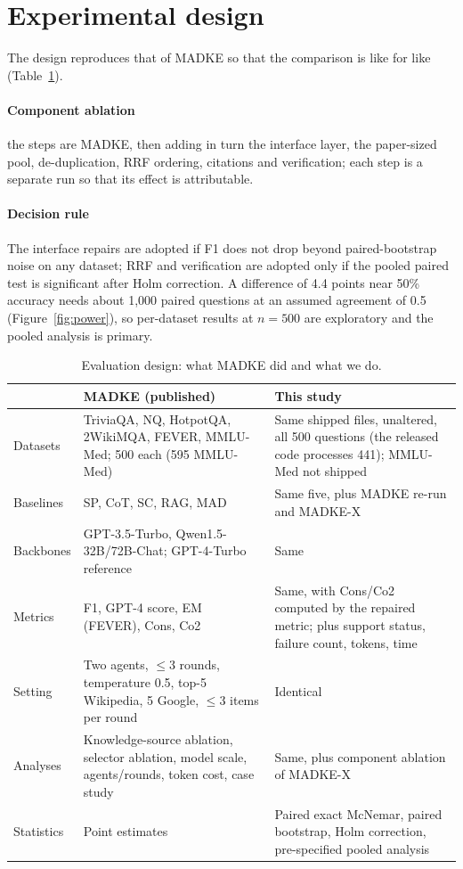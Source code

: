 \section{Experimental design}
\label{sec:design}

The design reproduces that of MADKE so that the comparison is like for like (Table~\ref{tab:design}).

\paragraph{Component ablation} the steps are MADKE, then adding in turn the interface layer, the paper-sized pool, de-duplication, RRF ordering, citations and verification; each step is a separate run so that its effect is attributable.

\paragraph{Decision rule} The interface repairs are adopted if F1 does not drop beyond paired-bootstrap noise on any dataset; RRF and verification are adopted only if the pooled paired test is significant after Holm correction. A difference of 4.4 points near 50\% accuracy needs about 1,000 paired questions at an assumed agreement of 0.5 (Figure~\ref{fig:power}), so per-dataset results at $n{=}500$ are exploratory and the pooled analysis is primary.

\begin{table}[!htbp]
\centering
\small
\caption{Evaluation design: what MADKE did and what we do.}
\label{tab:design}
\begin{tabular}{p{}p{}p{}}
\toprule
 & MADKE (published) & This study \\
\midrule
Datasets & TriviaQA, NQ, HotpotQA, 2WikiMQA, FEVER, MMLU-Med; 500 each (595 MMLU-Med) & Same shipped files, unaltered, all 500 questions (the released code processes 441); MMLU-Med not shipped \\
Baselines & SP, CoT, SC, RAG, MAD & Same five, plus MADKE re-run and MADKE-X \\
Backbones & GPT-3.5-Turbo, Qwen1.5-32B/72B-Chat; GPT-4-Turbo reference & Same \\
Metrics & F1, GPT-4 score, EM (FEVER), Cons, Co2 & Same, with Cons/Co2 computed by the repaired metric; plus support status, failure count, tokens, time \\
Setting & Two agents, $\le$3 rounds, temperature 0.5, top-5 Wikipedia, 5 Google, $\le$3 items per round & Identical \\
Analyses & Knowledge-source ablation, selector ablation, model scale, agents/rounds, token cost, case study & Same, plus component ablation of MADKE-X \\
Statistics & Point estimates & Paired exact McNemar, paired bootstrap, Holm correction, pre-specified pooled analysis \\
\bottomrule
\end{tabular}
\end{table}

